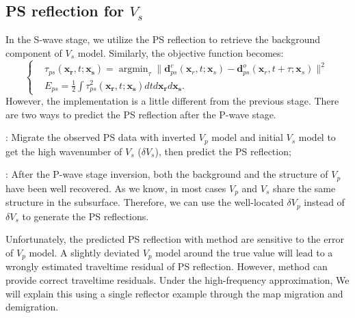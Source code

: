 \subsection{PS reflection for $V_s$}
In the S-wave stage, we utilize the PS reflection to retrieve the background component of
$V_s$ model. Similarly, the objective function becomes:
\begin{equation}
	\left\{
		\begin{aligned}
			&\tau_{ps}(\mathbf{x_r},t;\mathbf{x_s})=\mathop{\arg\min}_{\tau}
			\parallel\mathbf{d}^{c}_{ps}(\mathbf{x}_r,t;\mathbf{x}_s)-\mathbf{d}^{o}_{ps}(\mathbf{x}_r,t+\tau;\mathbf{x}_s)\parallel^2\\
			&E_{ps}=\frac{1}{2}\int\tau^2_{ps}(\mathbf{x_r},t;\mathbf{x_s})dtd\mathbf{x_r}d\mathbf{x_s}.
		\end{aligned}
	\right.
    \label{eq:ObjectivefunctionPP} 
\end{equation}
However, the implementation is a little different from the previous stage. 
There are two ways to predict the PS reflection after the P-wave stage.

{\bf{\uppercase\expandafter{}}}: Migrate the observed PS data with inverted $V_p$ model and
initial $V_s$ model to get the high wavenumber of $V_s$ ($\delta V_s$), then predict the PS reflection;

{\bf{\uppercase\expandafter{}}}:
After the
P-wave stage inversion, both the background and the structure of $V_p$ have been well recovered. As we know, in
most cases $V_p$ and $V_s$ share the same structure in the subsurface. Therefore, we
can use the well-located $\delta V_p$ instead of $\delta V_s$ to generate the PS reflections. 

Unfortunately, the predicted PS reflection with method {\bf\uppercase\expandafter{}} are
sensitive to the error of $V_p$ model. A slightly deviated $V_p$ model around the true value will lead
to a wrongly estimated traveltime residual of PS reflection. However, method
{\bf\uppercase\expandafter{}} can provide correct traveltime residuals. 
Under the high-frequency approximation, We will explain this using a single reflector example through 
the map migration and demigration.

